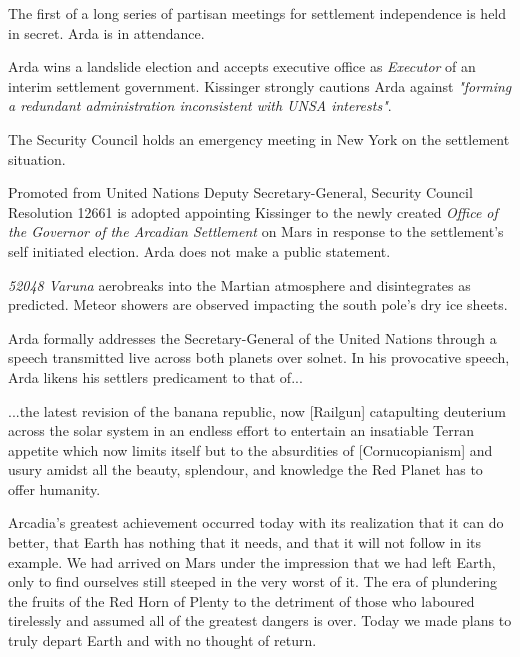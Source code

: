 The first of a long series of partisan meetings for settlement independence is held in secret. Arda is in attendance.
\StopTimelineDate

Arda wins a landslide election and accepts executive office as {\it Executor} of an interim settlement government. Kissinger strongly cautions Arda against {\it "forming a redundant administration inconsistent with UNSA interests"}. 

The Security Council holds an emergency meeting in New York on the settlement situation.
\StopTimelineDate

Promoted from United Nations Deputy Secretary-General, Security Council Resolution 12661 is adopted appointing Kissinger to the newly created {\it Office of the Governor of the Arcadian Settlement} on Mars in response to the settlement's self initiated election. Arda does not make a public statement.
\StopTimelineDate

{\it 52048 Varuna} aerobreaks into the Martian atmosphere and disintegrates as predicted. Meteor showers are observed impacting the south pole's dry ice sheets.
\StopTimelineDate

Arda formally addresses the Secretary-General of the United Nations through a speech transmitted live across both planets over solnet. In his provocative speech, Arda likens his settlers predicament to that of...

\startTimelineDocument
...the latest revision of the banana republic, now [Railgun] catapulting deuterium across the solar system in an endless effort to entertain an insatiable Terran appetite which now limits itself but to the absurdities of [Cornucopianism] and usury amidst all the beauty, splendour, and knowledge the Red Planet has to offer humanity.

Arcadia's greatest achievement occurred today with its realization that it can do better, that Earth has nothing that it needs, and that it will not follow in its example. We had arrived on Mars under the impression that we had left Earth, only to find ourselves still steeped in the very worst of it. The era of plundering the fruits of the Red Horn of Plenty to the detriment of those who laboured tirelessly and assumed all of the greatest dangers is over. Today we made plans to truly depart Earth and with no thought of return.
\stopTimelineDocument

